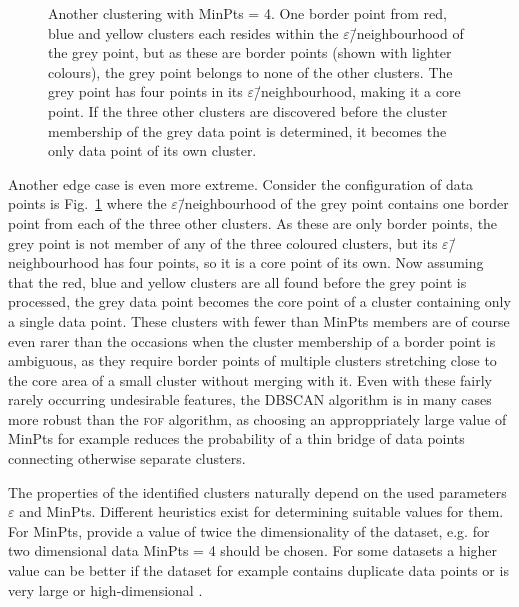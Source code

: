 \documentclass[english, twoside]{HYgradu}
\begin{document}
\begin{figure}
    \centering
    
    \caption{Another clustering with MinPts = 4. One border point from red, blue and yellow clusters each resides within the $\varepsilon$\=/neighbourhood of the grey point, but as these are border points (shown with lighter colours), the grey point belongs to none of the other clusters. The grey point has four points in its $\varepsilon$\=/neighbourhood, making it a core point. If the three other clusters are discovered before the cluster membership of the grey data point is determined, it becomes the only data point of its own cluster.}\label{fig:DBSCAN-singlecore}
\end{figure}

Another edge case is even more extreme. Consider the configuration of data points is Fig.\ \ref{fig:DBSCAN-singlecore} where the $\varepsilon$\=/neighbourhood of the grey point contains one border point from each of the three other clusters. As these are only border points, the grey point is not member of any of the three coloured clusters, but its $\varepsilon$\=/neighbourhood has four points, so it is a core point of its own. Now assuming that the red, blue and yellow clusters are all found before the grey point is processed, the grey data point becomes the core point of a cluster containing only a single data point. These clusters with fewer than MinPts members are of course even rarer than the occasions when the cluster membership of a border point is ambiguous, as they require border points of multiple clusters stretching close to the core area of a small cluster without merging with it. Even with these fairly rarely occurring undesirable features, the DBSCAN algorithm is in many cases more robust than the \textsc{fof} algorithm, as choosing an approppriately large value of MinPts for example reduces the probability of a thin bridge of data points connecting otherwise separate clusters.

The properties of the identified clusters naturally depend on the used parameters $\varepsilon$ and MinPts. Different heuristics exist for determining suitable values for them. For MinPts, \citet{schubert2017dbscan} provide a value of twice the dimensionality of the dataset, e.g. for two dimensional data MinPts = 4 should be chosen. For some datasets a higher value can be better if the dataset for example contains duplicate data points or is very large or high-dimensional \citep{schubert2017dbscan}.
\end{document}
